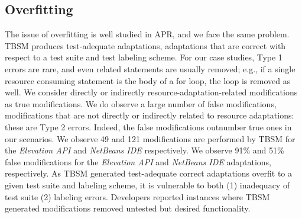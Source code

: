 \subsection{Overfitting}
The issue of overfitting is well studied in APR, and we face the same problem\cite{smith2015cwd}. TBSM produces test-adequate adaptations, adaptations that are correct with respect to a test suite and test labeling scheme. For our case studies, Type 1 errors are rare, and even related statements are usually removed; e.g., if a single resource consuming statement is the body of a for loop, the loop is removed as well. We consider directly or indirectly resource-adaptation-related modifications as true modifications. We do observe a large number of false modifications, modifications that are not directly or indirectly related to resource adaptations: these are Type 2 errors. Indeed, the false modifications outnumber true ones in our scenarios. We observe 49 and 121 modifications are performed by TBSM for the \textit{Elevation API} and \textit{NetBeans IDE} respectively. We observe 91\% and 51\% false modifications for the \textit{Elevation API} and \textit{NetBeans IDE} adaptations, respectively. As TBSM generated test-adequate correct adaptations overfit to a given test suite and labeling scheme, it is vulnerable to both (1) inadequacy of test suite (2) labeling errors. Developers reported instances where TBSM generated modifications removed untested but desired functionality. 
